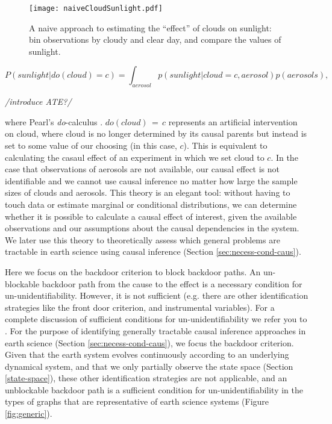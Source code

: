 \documentclass[12pt]{article}
\begin{document}
\begin{figure}
  \texttt{[image: naiveCloudSunlight.pdf]}
  \caption{A naive approach to estimating the ``effect'' of clouds on
    sunlight: bin observations by cloudy and clear day, and compare
    the values of sunlight.}
  \label{fig:naive-cloud-sunlight}
\end{figure}



\begin{equation}
  P(sunlight | do(cloud) = c) = \int_{aerosol} p(sunlight| cloud = c,
  aerosol) p(aerosols),
\end{equation}

\emph{/introduce ATE?/}

where Pearl's \textit{do}-calculus \citep{pearl2009}.
$do(cloud)\, = \,c$ represents an artificial intervention on cloud,
where cloud is no longer determined by its causal parents but instead
is set to some value of our choosing (in this case, $c$). This is
equivalent to calculating the casaul effect of an experiment in which
we set cloud to $c$. In the case that observations of aerosols are not
available, our causal effect is not identifiable and we cannot use
causal inference no matter how large the sample sizes of clouds and
aerosols. This theory is an elegant tool: without having to touch data
or estimate marginal or conditional distributions, we can determine
whether it is possible to calculate a causal effect of interest, given
the available observations and our assumptions about the causal
dependencies in the system. We later use this theory to theoretically
assess which general problems are tractable in earth science using
causal inference (Section \ref{sec:necess-cond-caus}).

Here we focus on the backdoor criterion to block backdoor paths. An
un-blockable backdoor path from the cause to the effect is a necessary
condition for un-unidentifiability. However, it is not sufficient
(e.g. there are other identification strategies like the front door
criterion, and instrumental variables). For a complete discussion of
sufficient conditions for un-unidentifiability we refer you to
\citet{shpitser2006}. For the purpose of identifying generally
tractable causal inference approaches in earth science (Section
\ref{sec:necess-cond-caus}), we focus the backdoor criterion. Given
that the earth system evolves continuously according to an underlying
dynamical system, and that we only partially observe the state space
(Section \ref{state-space}), these other identification strategies are
not applicable, and an unblockable backdoor path is a sufficient
condition for un-unidentifiability in the types of graphs that are
representative of earth science systems (Figure \ref{fig:generic}).
\end{document}
